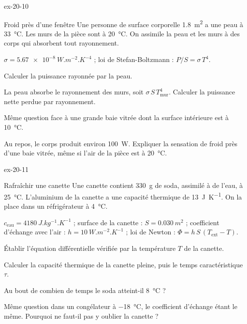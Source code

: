 \begin{blocLivre}{ex-20-10}
\begin{exercice}[2]{Froid près d'une fenêtre}
Une personne de surface corporelle \qty{1,8}{m^2} a une peau à \qty{33}{\degreeCelsius}. Les murs de la pièce sont à
\qty{20}{\degreeCelsius}. On assimile la peau et les murs à des corps qui absorbent tout rayonnement.
\begin{donnees}
$\sigma=\qty{5,67e-8}{W.m^{-2}.K^{-4}}$ ; loi de Stefan-Boltzmann : $P/S=\sigma\,T^4$.
\end{donnees}
\begin{questions}
\item Calculer la puissance rayonnée par la peau.
\item La peau absorbe le rayonnement des murs, soit $\sigma\,S\,T_\mathrm{mur}^4$. Calculer la puissance nette perdue par
rayonnement.
\item Même question face à une grande baie vitrée dont la surface intérieure est à \qty{10}{\degreeCelsius}.
\item Au repos, le corps produit environ \qty{100}{W}. Expliquer la sensation de froid près d'une baie vitrée, même si
l'air de la pièce est à \qty{20}{\degreeCelsius}.
\end{questions}
\end{exercice}
\end{blocLivre}
\begin{blocLivre}{ex-20-11}
\begin{exercice}[2]{Rafraîchir une canette}
Une canette contient \qty{330}{g} de soda, assimilé à de l'eau, à \qty{25}{\degreeCelsius}. L'aluminium de la canette a une capacité
thermique de \qty{13}{J.K^{-1}}. On la place dans un réfrigérateur à \qty{4}{\degreeCelsius}.
\begin{donnees}
$c_\mathrm{eau}=\qty{4180}{J.kg^{-1}.K^{-1}}$ ; surface de la canette : $S=\qty{0,030}{m^2}$ ; coefficient d'échange avec l'air :
$h=\qty{10}{W.m^{-2}.K^{-1}}$ ; loi de Newton : $\Phi=h\,S\,(T_\mathrm{ext}-T)$.
\end{donnees}
\begin{questions}
\item Établir l'équation différentielle vérifiée par la température $T$ de la canette.
\item Calculer la capacité thermique de la canette pleine, puis le temps caractéristique $\tau$.
\item Au bout de combien de temps le soda atteint-il \qty{8}{\degreeCelsius} ?
\item Même question dans un congélateur à \qty{-18}{\degreeCelsius}, le coefficient d'échange étant le même. Pourquoi ne faut-il pas
y oublier la canette ?
\end{questions}
\end{exercice}
\end{blocLivre}
